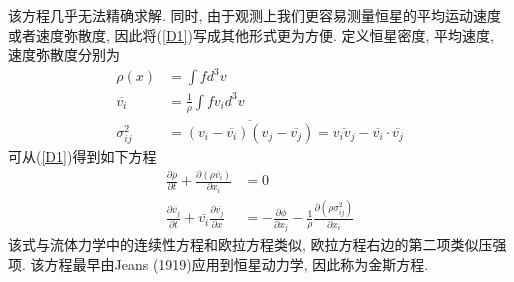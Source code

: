 该方程几乎无法精确求解. 同时, 由于观测上我们更容易测量恒星的平均运动速度或者速度弥散度, 因此将(\ref{D1})写成其他形式更为方便. 定义恒星密度, 平均速度, 速度弥散度分别为
\begin{align*}
    \rho(x)&=\int fd^3 v\\
    \overline{v_i}&=\frac{1}{\rho}\int fv_i d^3 v\\
    \sigma_{ij}^2&=\overline{(v_i-\overline{v_i})(v_j-\overline{v_j})}=\overline{v_i v_j}-\overline{v_i}\cdot\overline{v_j}
\end{align*}
可从(\ref{D1})得到如下方程
\begin{align*}
    \frac{\partial \rho}{\partial t}+\frac{\partial (\rho \overline{v_i})}{\partial x_i}&=0\\
    \frac{\partial \overline{v_j}}{\partial t}+\overline{v_i}\frac{\partial \overline{v_j}}{\partial x}&=-\frac{\partial \phi}{\partial x_j}-\frac{1}{\rho}\frac{\partial (\rho \sigma_{ij}^2)}{\partial x_i}
\end{align*}
该式与流体力学中的连续性方程和欧拉方程类似, 欧拉方程右边的第二项类似压强项. 该方程最早由Jeans (1919)应用到恒星动力学, 因此称为金斯方程. 


